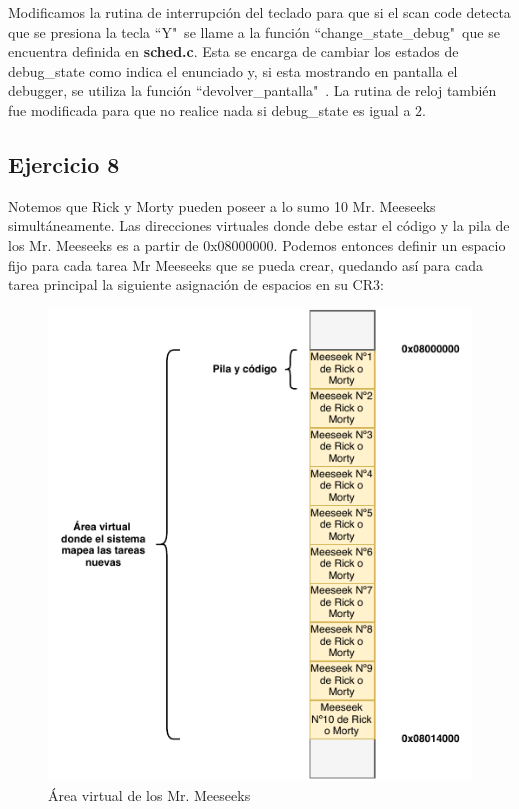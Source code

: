 \documentclass[a4paper]{article}
\begin{document}
\justify
Modificamos la rutina de interrupción del teclado para que si el scan code detecta que se presiona la tecla ``Y"\ se llame a la función ``change_state_debug"\ que se encuentra definida en \textbf{sched.c}. Esta se encarga de cambiar los estados de debug_state como indica el enunciado y, si esta mostrando en pantalla el debugger, se utiliza la función ``devolver_pantalla"\ . La rutina de reloj también fue modificada para que no realice nada si debug_state es igual a $2$.


\subsection{Ejercicio 8}
\justify
Notemos que Rick y Morty pueden poseer a lo sumo 10 Mr. Meeseeks simultáneamente. Las direcciones virtuales donde debe estar el código y la pila de los Mr. Meeseeks es a partir de 0x08000000. Podemos entonces definir un espacio fijo para cada tarea Mr Meeseeks que se pueda crear, quedando así para cada tarea principal la siguiente asignación de espacios en su CR3:

\begin{figure}[h]
	\centering
	\includegraphics[scale=1.1]{img/AreaVirtualMeeseeks.pdf}
	\caption{Área virtual de los Mr. Meeseeks}
\end{figure}
\end{document}

